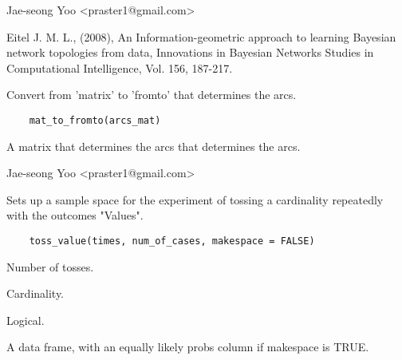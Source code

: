 \documentclass[a4paper]{book}
\begin{document}
%
\begin{Author}\relax
 Jae-seong Yoo <praster1@gmail.com> 
\end{Author}
%
\begin{References}\relax
Eitel J. M. L., (2008), An Information-geometric approach to learning Bayesian network topologies from data, Innovations in Bayesian Networks Studies in Computational Intelligence, Vol. 156, 187-217.
\end{References}
%
\begin{Description}\relax
Convert from 'matrix' to 'fromto' that determines the arcs.
\end{Description}
%
\begin{Usage}
\begin{verbatim}
	mat_to_fromto(arcs_mat)
\end{verbatim}
\end{Usage}
%
\begin{Arguments}
\begin{ldescription}
\item[\code{arcs\_mat}]  A matrix that determines the arcs that determines the arcs. 
\end{ldescription}
\end{Arguments}
%
\begin{Author}\relax
 Jae-seong Yoo <praster1@gmail.com> 
\end{Author}
%
\begin{Description}\relax
Sets up a sample space for the experiment of tossing a cardinality repeatedly with the outcomes "Values".
\end{Description}
%
\begin{Usage}
\begin{verbatim}
	toss_value(times, num_of_cases, makespace = FALSE)
\end{verbatim}
\end{Usage}
%
\begin{Arguments}
\begin{ldescription}
\item[\code{times}]  Number of tosses. 
\item[\code{num\_of\_cases}]  Cardinality. 
\item[\code{makespace}]  Logical. 
\end{ldescription}
\end{Arguments}
%
\begin{Value}
A data frame, with an equally likely probs column if makespace is TRUE.
\end{Value}
\end{document}
